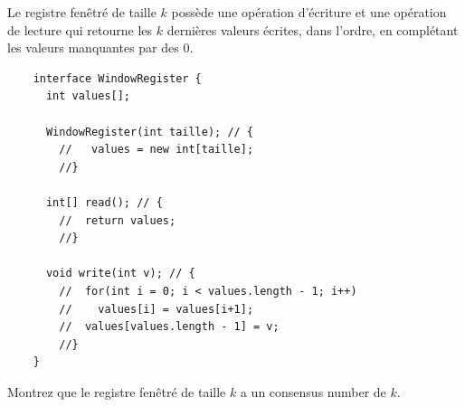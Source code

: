 
\begingroup

\begin{exercice}
  Le registre fenêtré de taille $k$ possède une opération d'écriture et une opération
  de lecture qui retourne les $k$ dernières valeurs écrites, dans l'ordre, en complétant les valeurs manquantes par des 0. 
  \begin{lstlisting}
    interface WindowRegister {
      int values[];
      
      WindowRegister(int taille); // {
        //   values = new int[taille];
        //}
      
      int[] read(); // {
        //  return values;
        //}
      
      void write(int v); // {
        //  for(int i = 0; i < values.length - 1; i++)
        //    values[i] = values[i+1];
        //  values[values.length - 1] = v;
        //}
    }
  \end{lstlisting}
  \begin{questions}
  \item Montrez que le registre fenêtré de taille $k$ a un consensus number de $k$.
  \end{questions}
\end{exercice}

\endgroup
\endinput
